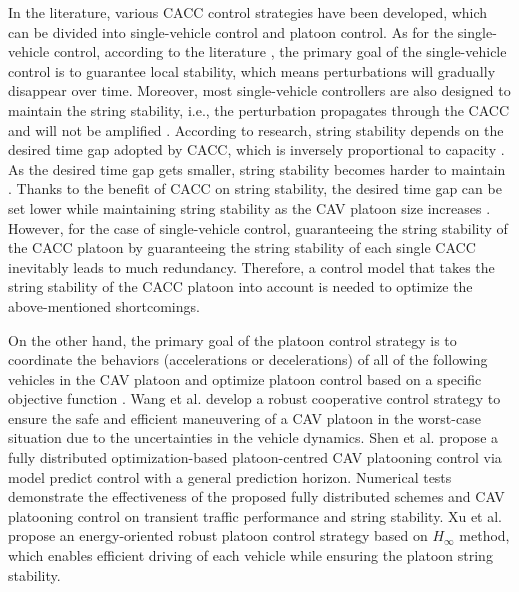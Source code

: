 \documentclass[journal]{IEEEtran}
\begin{document}
In the literature, various CACC control strategies have been developed, which can be divided into single-vehicle control and platoon control. As for the single-vehicle control, according to the literature \citep{qin2018stability,ruan2021stability}, the primary goal of the single-vehicle control is to guarantee local stability, which means perturbations will gradually disappear over time. Moreover, most single-vehicle controllers are also designed to maintain the string stability, i.e., the perturbation propagates through the CACC and will not be amplified \citep{wang2018infrastructure,sun2018stability,ploeg2013lp}. According to research, string stability depends on the desired time gap adopted by CACC, which is inversely proportional to capacity \citep{wang2019stability,qin2021lighthill}. As the desired time gap gets smaller, string stability becomes harder to maintain \citep{navas2016using}. Thanks to the benefit of CACC on string stability, the desired time gap can be set lower while maintaining string stability as the CAV platoon size increases \citep{Qin2021b}. However, for the case of single-vehicle control, guaranteeing the string stability of the CACC platoon by guaranteeing the string stability of each single CACC inevitably leads to much redundancy. Therefore, a control model that takes the string stability of the CACC platoon into account is needed to optimize the above-mentioned shortcomings.

On the other hand, the primary goal of the platoon control strategy is to coordinate the behaviors (accelerations or decelerations) of all of the following vehicles in the CAV platoon and optimize platoon control based on a specific objective function \citep{Wang2022a,Shen2021,Xu2019a}. Wang et al. \citep{Wang2022a} develop a robust cooperative control strategy to ensure the safe and efficient maneuvering of a CAV platoon in the worst-case situation due to the uncertainties in the vehicle dynamics. Shen et al. \citep{Shen2021} propose a fully distributed optimization-based platoon-centred CAV platooning control via model predict control with a general prediction horizon. Numerical tests demonstrate the effectiveness of the proposed fully distributed schemes and CAV platooning control on transient traffic performance and string stability. Xu et al. \citep{Xu2019a} propose an energy-oriented robust platoon control strategy based on $H_{\infty}$ method, which enables efficient driving of each vehicle while ensuring the platoon string stability.
\end{document}
